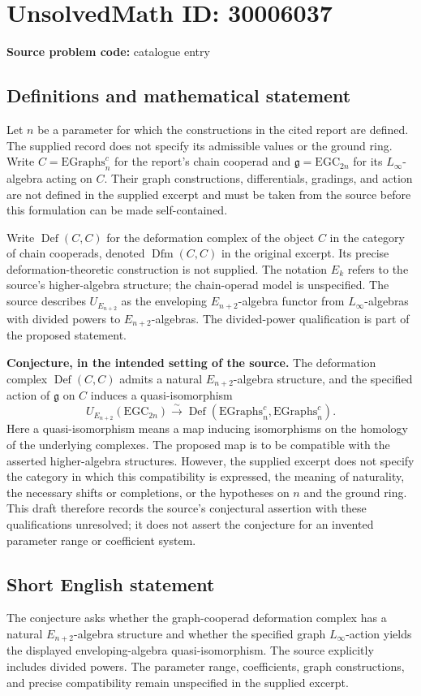 \documentclass[11pt]{article}
\begin{document}
\section*{UnsolvedMath ID: 30006037}
\textbf{Source problem code:} catalogue entry
\subsection{Definitions and mathematical statement}
Let \(n\) be a parameter for which the constructions in the cited report are defined. The supplied record does not specify its admissible values or the ground ring. Write \(C=\mathrm{EGraphs}_n^c\) for the report's chain cooperad and \(\mathfrak g=\mathrm{EGC}_{2n}\) for its \(L_\infty\)-algebra acting on \(C\). Their graph constructions, differentials, gradings, and action are not defined in the supplied excerpt and must be taken from the source before this formulation can be made self-contained.

Write \(\operatorname{Def}(C,C)\) for the deformation complex of the object \(C\) in the category of chain cooperads, denoted \(\operatorname{Dfm}(C,C)\) in the original excerpt. Its precise deformation-theoretic construction is not supplied. The notation \(E_k\) refers to the source's higher-algebra structure; the chain-operad model is unspecified. The source describes \(U_{E_{n+2}}\) as the enveloping \(E_{n+2}\)-algebra functor from \(L_\infty\)-algebras with divided powers to \(E_{n+2}\)-algebras. The divided-power qualification is part of the proposed statement.

\textbf{Conjecture, in the intended setting of the source.} The deformation complex \(\operatorname{Def}(C,C)\) admits a natural \(E_{n+2}\)-algebra structure, and the specified action of \(\mathfrak g\) on \(C\) induces a quasi-isomorphism
\[
U_{E_{n+2}}(\mathrm{EGC}_{2n})
\xrightarrow{\ \sim\ }
\operatorname{Def}(\mathrm{EGraphs}_n^c,\mathrm{EGraphs}_n^c).
\]
Here a quasi-isomorphism means a map inducing isomorphisms on the homology of the underlying complexes. The proposed map is to be compatible with the asserted higher-algebra structures. However, the supplied excerpt does not specify the category in which this compatibility is expressed, the meaning of naturality, the necessary shifts or completions, or the hypotheses on \(n\) and the ground ring. This draft therefore records the source's conjectural assertion with these qualifications unresolved; it does not assert the conjecture for an invented parameter range or coefficient system.
\subsection{Short English statement}
The conjecture asks whether the graph-cooperad deformation complex has a natural \(E_{n+2}\)-algebra structure and whether the specified graph \(L_\infty\)-action yields the displayed enveloping-algebra quasi-isomorphism. The source explicitly includes divided powers. The parameter range, coefficients, graph constructions, and precise compatibility remain unspecified in the supplied excerpt.
\end{document}
